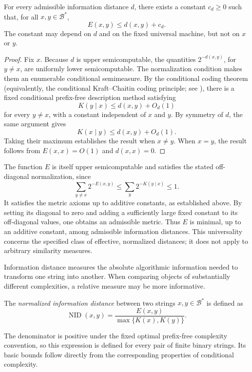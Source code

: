 \begin{proposition}
\label{prop:information-distance-universality}
For every admissible information distance $d$, there exists a constant $c_d\geq 0$ such that, for all $x,y\in\mathcal{B}^*$,
\[
E(x,y)\leq d(x,y)+c_d.
\]
The constant may depend on $d$ and on the fixed universal machine, but not on $x$ or $y$.
\end{proposition}
\begin{proof}
Fix $x$. Because $d$ is upper semicomputable, the quantities $2^{-d(x,y)}$, for $y\neq x$, are uniformly lower semicomputable. The normalization condition makes them an enumerable conditional semimeasure. By the conditional coding theorem (equivalently, the conditional Kraft--Chaitin coding principle; see \cite{LV13}), there is a fixed conditional prefix-free description method satisfying
\[
K(y\mid x)\leq d(x,y)+O_d(1)
\]
for every $y\neq x$, with a constant independent of $x$ and $y$. By symmetry of $d$, the same argument gives
\[
K(x\mid y)\leq d(x,y)+O_d(1).
\]
Taking their maximum establishes the result when $x\neq y$. When $x=y$, the result follows from $E(x,x)=O(1)$ and $d(x,x)=0$.
\end{proof}

The function $E$ is itself upper semicomputable and satisfies the stated off-diagonal normalization, since
\[
\sum_{y\neq x}2^{-E(x,y)}
\leq\sum_y2^{-K(y\mid x)}\leq 1.
\]
It satisfies the metric axioms up to additive constants, as established above. By setting its diagonal to zero and adding a sufficiently large fixed constant to its off-diagonal values, one obtains an admissible metric. Thus $E$ is minimal, up to an additive constant, among admissible information distances. This universality concerns the specified class of effective, normalized distances; it does not apply to arbitrary similarity measures.

Information distance measures the absolute algorithmic information needed to transform one string into another. When comparing objects of substantially different complexities, a relative measure may be more informative.

\begin{definition}
\label{def:normalized-information-distance}
The \emph{normalized information distance} between two strings $x,y\in\mathcal{B}^*$ is defined as
\[
\operatorname{NID}(x,y)
=\frac{E(x,y)}{\max\{K(x),K(y)\}}.
\]
\end{definition}

The denominator is positive under the fixed optimal prefix-free complexity convention, so this expression is defined for every pair of finite binary strings. Its basic bounds follow directly from the corresponding properties of conditional complexity.

